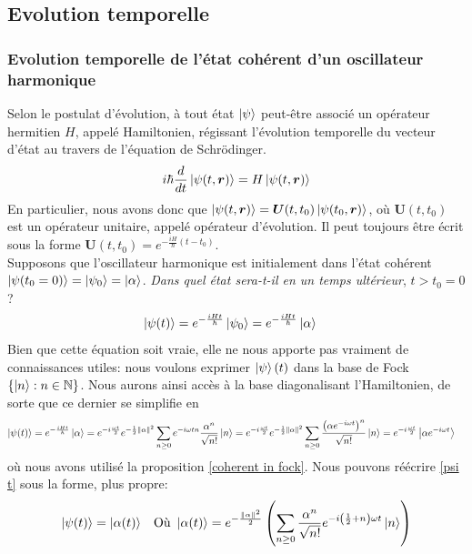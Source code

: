 \documentclass[11pt,oneside,a4paper]{article}
\newcommand{\h}{\ensuremath{\hbar}}
\begin{document}
\subsection{Evolution temporelle}
\subsubsection{Evolution temporelle de l'état cohérent d'un oscillateur harmonique}
Selon le postulat d'évolution, à tout état $\ket{\psi}$ peut-être associé un opérateur hermitien $H$, appelé Hamiltonien, régissant l'évolution temporelle du vecteur d'état au travers de l'équation de Schrödinger.
\begin{equation}
  i\h\frac{d}{dt}\ket{\psi(t,\bm{r})} = H\ket{\psi (t,\bm{r})}
\end{equation}
En particulier, nous avons donc que $\ket{\psi(t,\bm{r})} = \bm{U}(t,t_0)\ket{\psi(t_0,\bm{r})}$, où $\bm{U}(t,t_0)$ est un opérateur unitaire, appelé opérateur d'évolution. Il peut toujours être écrit sous la forme $\bm{U}(t,t_0) = e^{-\frac{iH}{\h}(t-t_0)}$.\\

Supposons que l'oscillateur harmonique est initialement dans l'état cohérent $\ket{\psi (t_0 = 0)} = \ket{\psi_0} = \ket{\alpha}$. \emph{Dans quel état sera-t-il en un temps ultérieur}, $t>t_0 = 0$ ?
\begin{align}
  \ket{\psi(t)} &= e^{-\frac{iHt}{\h}}\ket{\psi_0} = e^{-\frac{iHt}{\h}}\ket{\alpha}  
\end{align}
Bien que cette équation soit vraie, elle ne nous apporte pas vraiment de connaissances utiles: nous voulons exprimer $\ket{\psi} (t)$ dans la base de Fock $\left\{\ket{n} : n\in\mathbb{N}\right\}$. Nous aurons ainsi accès à la base diagonalisant l'Hamiltonien, de sorte que ce dernier se simplifie en
\begin{align}
  \ket{\psi(t)} = e^{-\frac{iHt}{\h}}\ket{\alpha} &= e^{-i\frac{\omega t}{2}}e^{-\frac{1}{2}\norm{\alpha}^2}\sum_{n\geq 0}e^{-i\omega tn}\frac{\alpha^n}{\sqrt{n!}}\ket{n}
  = e^{-i\frac{\omega t}{2}}e^{-\frac{1}{2}\norm{\alpha}^2}\sum_{n\geq 0}\frac{\left(\alpha e^{-i\omega t}\right)^n}{\sqrt{n!}}\ket{n}
  = e^{-i\frac{\omega t}{2}}\ket{\alpha e^{-i\omega t}}\label{psi t}
\end{align}
où nous avons utilisé la proposition \eqref{coherent in fock}. Nous pouvons réécrire \eqref{psi t} sous la forme, plus propre:
\begin{align}
  \ket{\psi(t)} &= \ket{\alpha(t)} &\text{Où }\ket{\alpha(t)} = e^{-\frac{\norm{\alpha}^2}{2}}\left(\sum_{n\geq 0}\frac{\alpha^n}{\sqrt{n!}}e^{-i\left(\frac{1}{2}+n    \right)\omega t}\ket{n}\right) 
\end{align}
\end{document}
